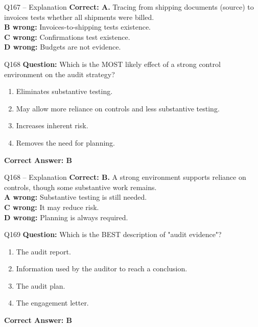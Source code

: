 \documentclass[aspectratio=169,10pt]{beamer}
\begin{document}
	\begin{frame}[t]{Q167 -- Explanation}
		\small
		\textbf{Correct: A.} Tracing from shipping documents (source) to invoices tests whether all shipments were billed. \\[4pt]
		\textbf{B wrong:} Invoices-to-shipping tests existence. \\[2pt]
		\textbf{C wrong:} Confirmations test existence. \\[2pt]
		\textbf{D wrong:} Budgets are not evidence.
	\end{frame}
	
	\begin{frame}[t]{Q168}
		\small
		\textbf{Question:} Which is the MOST likely effect of a strong control environment on the audit strategy?
		\begin{enumerate}[label=\Alph*.,itemsep=1pt,topsep=2pt]
			\item Eliminates substantive testing.
			\item May allow more reliance on controls and less substantive testing.
			\item Increases inherent risk.
			\item Removes the need for planning.
		\end{enumerate}
		\vspace{4pt}
		\textbf{Correct Answer: B}
	\end{frame}
	
	\begin{frame}[t]{Q168 -- Explanation}
		\small
		\textbf{Correct: B.} A strong environment supports reliance on controls, though some substantive work remains. \\[4pt]
		\textbf{A wrong:} Substantive testing is still needed. \\[2pt]
		\textbf{C wrong:} It may reduce risk. \\[2pt]
		\textbf{D wrong:} Planning is always required.
	\end{frame}
	
	\begin{frame}[t]{Q169}
		\small
		\textbf{Question:} Which is the BEST description of "audit evidence"?
		\begin{enumerate}[label=\Alph*.,itemsep=1pt,topsep=2pt]
			\item The audit report.
			\item Information used by the auditor to reach a conclusion.
			\item The audit plan.
			\item The engagement letter.
		\end{enumerate}
		\vspace{4pt}
		\textbf{Correct Answer: B}
	\end{frame}
	
\end{document}

